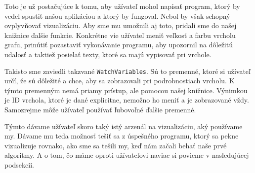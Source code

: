 Toto je už postačujúce k tomu, aby užívateľ mohol napísať program, ktorý by vedel spustiť našou
aplikáciou a ktorý by fungoval. Nebol by však schopný ovplyvňovať vizualizáciu. Aby sme mu umožnili
aj toto, pridali sme do našej knižnice ďalšie funkcie. Konkrétne vie užívateľ meniť veľkosť a farbu
vrcholu grafu, prinútiť pozastaviť vykonávanie programu, aby upozornil na dôležitú udalosť a
taktiež posielať texty, ktoré sa majú vypisovať pri vrchole.

Takisto sme zaviedli takzvané \verb!WatchVariables!. Sú to premenné, ktoré si užívateľ určí, že sú
dôležité a chce, aby sa zobrazovali pri podrobnostiach vrcholu. K týmto premenným nemá priamy
prístup, ale pomocou našej knižnice. Výnimkou je ID vrchola, ktoré je dané explicitne, nemožno ho
meniť a je zobrazované vždy. Samozrejme môže užívateľ používať ľubovoľné ďalšie premenné.

Týmto dávame užívateľ skoro taký istý arzenál na vizualizáciu, aký používame my. Dávame mu teda
možnosť tešiť sa z úspešného programu, ktorý sa pekne vizualizuje rovnako, ako sme sa tešili my, keď
nám začali behať naše prvé algoritmy. A o tom, čo máme oproti užívateľovi naviac si povieme v
nasledujúcej podsekcii.
